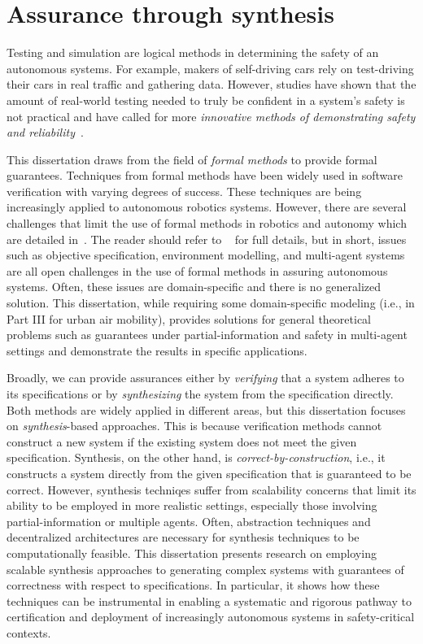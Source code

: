 \section{Assurance through synthesis}

Testing and simulation are logical methods in determining the safety of an autonomous systems. For example, makers of self-driving cars rely on test-driving their cars in real traffic and gathering data. However, studies have shown that the amount of real-world testing needed to truly be confident in a system's safety is not practical and have called for more \emph{innovative methods of demonstrating safety and reliability}~\cite{KALRA2016182}. 

This dissertation draws from the field of \emph{formal methods} to provide formal guarantees. Techniques from formal methods have been widely used in software verification with varying degrees of success. These techniques are being increasingly applied to autonomous robotics systems. However, there are several challenges that limit the use of formal methods in robotics and autonomy which are detailed in~\cite{10.1145/3342355}. The reader should refer to ~\cite{10.1145/3342355} for full details, but in short, issues such as objective specification, environment modelling, and multi-agent systems are all open challenges in the use of formal methods in assuring autonomous systems. Often, these issues are domain-specific and there is no generalized solution. This dissertation, while requiring some domain-specific modeling (i.e., in Part III for urban air mobility), provides solutions for general theoretical problems such as guarantees under partial-information and safety in multi-agent settings and demonstrate the results in specific applications. 

Broadly, we can provide assurances either by \emph{verifying} that a system adheres to its specifications or by \emph{synthesizing} the system from the specification directly. Both methods are widely applied in different areas, but this dissertation focuses on \emph{synthesis}-based approaches. This is because verification methods cannot construct a new system if the existing system does not meet the given specification. Synthesis, on the other hand, is \emph{correct-by-construction}, i.e., it constructs a system directly from the given specification that is guaranteed to be correct. However, synthesis techniqes suffer from scalability concerns that limit its ability to be employed in more realistic settings, especially those involving partial-information or multiple agents. Often, abstraction techniques and decentralized architectures are necessary for synthesis techniques to be computationally feasible. This dissertation presents research on employing scalable synthesis approaches to generating complex systems with guarantees of correctness with respect to specifications. In particular, it shows how these techniques can be instrumental in enabling a systematic and rigorous pathway to certification and deployment of increasingly autonomous systems in safety-critical contexts.  


